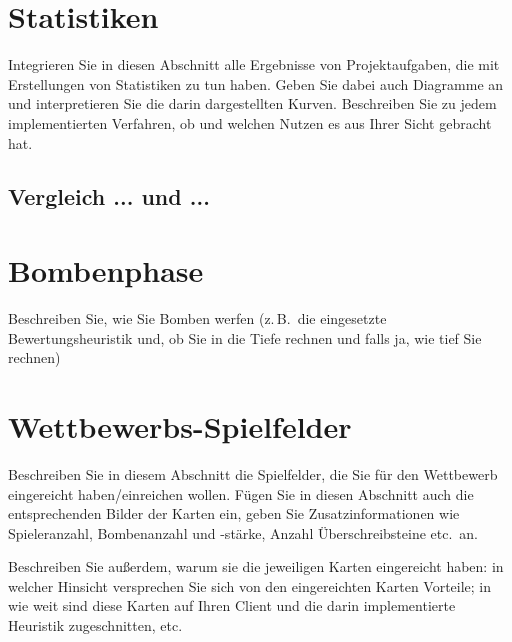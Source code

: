 \documentclass[12pt,a4paper]{article}
\begin{document}
\newpage
\section{Statistiken}
Integrieren Sie in diesen Abschnitt alle Ergebnisse von Projektaufgaben, die mit Erstellungen von Statistiken zu tun haben. Geben Sie dabei auch Diagramme an und interpretieren Sie die darin dargestellten Kurven. Beschreiben Sie zu jedem implementierten Verfahren, ob und welchen Nutzen es aus Ihrer Sicht gebracht hat.

\subsection{Vergleich ... und ...}

\newpage
\section{Bombenphase}
Beschreiben Sie, wie Sie Bomben werfen (z.\,B.\ die eingesetzte Bewertungsheuristik und, ob Sie in die Tiefe rechnen und falls ja, wie tief Sie rechnen)


\newpage
\section{Wettbewerbs-Spielfelder}
Beschreiben Sie in diesem Abschnitt die Spielfelder, die Sie für den Wettbewerb eingereicht haben/einreichen wollen. Fügen Sie in diesen Abschnitt auch die entsprechenden Bilder der Karten ein, geben Sie Zusatzinformationen wie Spieleranzahl, Bombenanzahl und -stärke, Anzahl Überschreibsteine etc.\ an.

Beschreiben Sie außerdem, warum sie die jeweiligen Karten eingereicht haben: in welcher Hinsicht versprechen Sie sich von den eingereichten Karten Vorteile; in wie weit sind diese Karten auf Ihren Client und die darin implementierte Heuristik zugeschnitten, etc.
\end{document}
